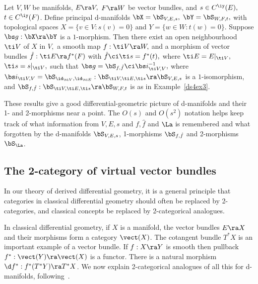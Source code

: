 \documentclass{article}
\begin{document}
\begin{thm} Let\/ $V,W$ be manifolds, $E\ra V,$ $F\ra W$ be vector
bundles, and\/ $s\in C^\iy(E),$ $t\in C^\iy(F)$. Define principal
d-manifolds\/ $\bX=\bS_{V,E,s},$ $\bY=\bS_{W,F,t},$ with topological
spaces $X=\{v\in V:s(v)=0\}$ and\/ $Y=\{w\in W:t(w)=0\}$. Suppose
$\bs g:\bX\ra\bY$ is a $1$-morphism. Then there exist an open
neighbourhood\/ $\ti V$ of\/ $X$ in $V,$ a smooth map $f:\ti V\ra
W,$ and a morphism of vector bundles $\hat f:\ti E\ra f^*(F)$ with\/
$\hat f\ci\ti s= f^*(t),$ where $\ti E=E\vert_{\ti V},$ $\ti
s=s\vert_{\ti V},$ such that\/ $\bs g=\bS_{\smash{f,\hat f}}\ci\bs
i_{\ti V,V}^{-1},$ where $\bs i_{\ti V,V}=\bS_{\smash{\id_{\ti
V},\id_{\ti E}}}:\bS_{\smash{\ti V,\ti E,\ti s}}\ra \bS_{V,E,s}$ is
a $1$-isomorphism, and\/ $\bS_{\smash{f,\hat f}}:\bS_{\smash{\ti
V,\ti E,\ti s}}\ra \bS_{W,F,t}$ is as in
Example\/~{\rm\ref{ds4ex3}}.
\label{ds4thm2}
\end{thm}

These results give a good differential-geometric picture of
d-manifolds and their 1- and 2-morphisms near a point. The $O(s)$
and $O(s^2)$ notation helps keep track of what information from
$V,E,s$ and $f,\hat f$ and $\La$ is remembered and what forgotten by
the d-manifolds $\bS_{V,E,s}$, 1-morphisms $\bS_{\smash{f,\hat f}}$
and 2-morphisms~$\bS_\La$.

\subsection{The 2-category of virtual vector bundles}
\label{ds43}

In our theory of derived differential geometry, it is a general
principle that categories in classical differential geometry should
often be replaced by 2-categories, and classical concepts be
replaced by 2-categorical analogues.

In classical differential geometry, if $X$ is a manifold, the vector
bundles $E\ra X$ and their morphisms form a category $\vect(X)$. The
cotangent bundle $T^*X$ is an important example of a vector bundle.
If $f:X\ra Y$ is smooth then pullback $f^*:\vect(Y)\ra\vect(X)$ is a
functor. There is a natural morphism $\d f^*:f^*(T^*Y)\ra T^*X$. We
now explain 2-categorical analogues of all this for d-manifolds,
following~\cite[\S 3.1--\S 3.2]{Joyc6}.
\end{document}

